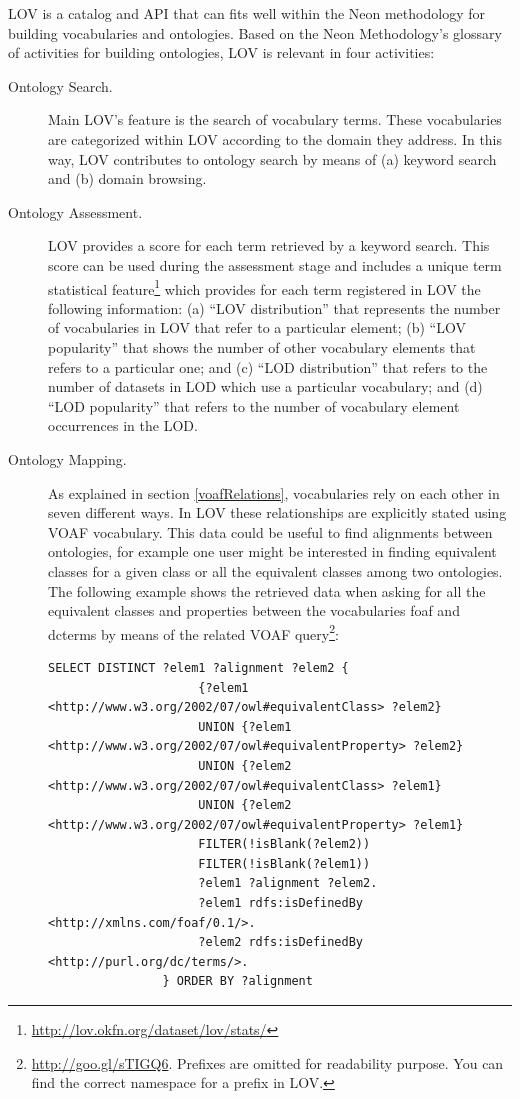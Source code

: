  LOV is a catalog and API that can fits well within the Neon methodology for building vocabularies and ontologies.  Based on the Neon Methodology's glossary of activities for building ontologies, LOV is relevant in four activities:
		
\begin{description}
		\item [Ontology Search.] Main LOV's feature is the search of vocabulary terms. These vocabularies are categorized within LOV according to the domain they address. In this way, LOV contributes to ontology search by means of (a) keyword search and (b) domain browsing.
		\item [Ontology Assessment.] LOV provides a score for each term retrieved by a keyword search. This score can be used during the assessment stage and includes a unique term statistical feature\footnote{\url{http://lov.okfn.org/dataset/lov/stats/}} which provides for each term registered in LOV the following information: (a) ``LOV distribution'' that represents the number of vocabularies in LOV that refer to a particular element; (b) ``LOV popularity'' that shows the number of other vocabulary elements that refers to a particular one; and (c) ``LOD distribution'' that refers to the number of datasets in LOD which use a particular vocabulary; and (d) ``LOD popularity'' that refers to the number of vocabulary element occurrences in the LOD.
		\item [Ontology Mapping.] As explained in section \ref{voafRelations}, vocabularies rely on each other in seven different ways. In LOV these relationships are explicitly stated using VOAF vocabulary. This data could be useful to find alignments between ontologies, for example one user might be interested in finding equivalent classes for a given class or all the equivalent classes among two ontologies. The following example shows the retrieved data when asking for all the equivalent classes and properties between the vocabularies foaf and dcterms by means of the related VOAF query\footnote{\url{http://goo.gl/sTIGQ6}. Prefixes are omitted for readability purpose. You can find the correct namespace for a prefix in LOV.}: 
				
		{\small\begin{verbatim}SELECT DISTINCT ?elem1 ?alignment ?elem2 {
				     {?elem1 <http://www.w3.org/2002/07/owl#equivalentClass> ?elem2}
				     UNION {?elem1 <http://www.w3.org/2002/07/owl#equivalentProperty> ?elem2}
				     UNION {?elem2 <http://www.w3.org/2002/07/owl#equivalentClass> ?elem1}
				     UNION {?elem2 <http://www.w3.org/2002/07/owl#equivalentProperty> ?elem1}
				     FILTER(!isBlank(?elem2))
				     FILTER(!isBlank(?elem1))
				     ?elem1 ?alignment ?elem2.
				     ?elem1 rdfs:isDefinedBy <http://xmlns.com/foaf/0.1/>.
				     ?elem2 rdfs:isDefinedBy <http://purl.org/dc/terms/>.
				} ORDER BY ?alignment\end{verbatim}}
				

\end{description}

